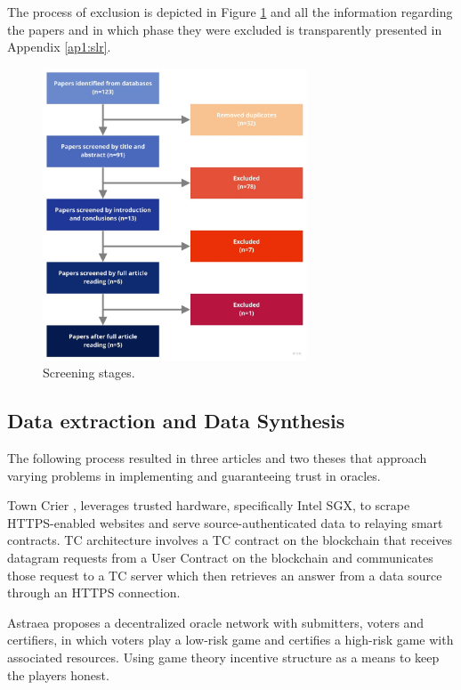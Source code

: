 The process of exclusion is depicted in Figure \ref{fig:/figures/paper-screening} and all the information regarding the papers and in which phase they were excluded is transparently presented in Appendix \ref{ap1:slr}.

\begin{figure}[t]
  \begin{center}
    \leavevmode
    \includegraphics[width=0.7\textwidth]{figures/paper-screening.jpg}
    \caption{Screening stages.}
    \label{fig:/figures/paper-screening}
  \end{center}
\end{figure}

\subsection{Data extraction and Data Synthesis}

The following process resulted in three articles and two theses that approach varying problems in implementing and guaranteeing trust in oracles.

Town Crier \cite{Zhang2016TownCrier}, leverages trusted hardware, specifically Intel SGX, to scrape HTTPS-enabled websites and serve source-authenticated data to relaying smart contracts. TC architecture involves a TC contract on the blockchain that receives datagram requests from a User Contract on the blockchain and communicates those request to a TC server which then retrieves an answer from a data source through an HTTPS connection.

Astraea \cite{Adler2018Astraea:Oracleb} proposes a decentralized oracle network with submitters, voters and certifiers, in which voters play a low-risk game and certifies a high-risk game with associated resources. Using game theory incentive structure as a means to keep the players honest.

